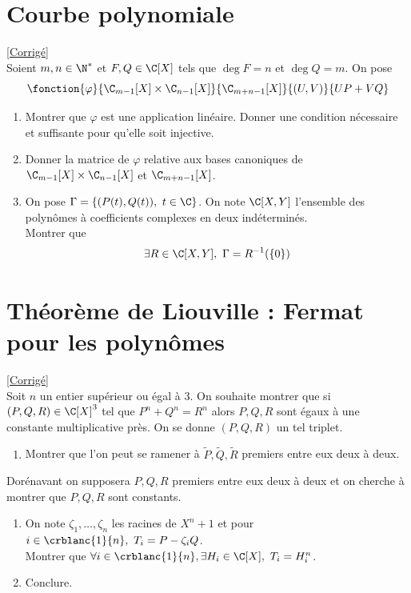 \documentclass{book}
\begin{document}
	\section{Courbe polynomiale}
	\textcolor{blue}{\hyperref[Courbe polynomiale corrigé]{[Corrigé]}}\\
	\label{Courbe polynomiale}
	Soient $m,n\in \N^*$ et $F,Q\in \C[X]$ tels que $\deg F=n$ et $\deg Q=m$. On pose $$\fonction{\varphi}{\C_{m-1}[X]\times \C_{n-1}[X]}{\C_{m+n-1}[X]}{(U,V)}{UP+VQ}$$
	\begin{enumerate}
		\item Montrer que $\varphi$ est une application linéaire. Donner une condition nécessaire et suffisante pour qu'elle soit injective.
		\item Donner la matrice de $\varphi$ relative aux bases canoniques de $\C_{m-1}[X]\times \C_{n-1}[X]$ et $\C_{m+n-1}[X]$.
		\item On pose $\Gamma=\{(P(t),Q(t)),\ t\in \C\}$. On note $\C[X,Y]$ l'ensemble des polynômes à coefficients complexes en deux indéterminés.\\
		Montrer que
		$$\exists R\in \C[X,Y],\ \Gamma=R^{-1}(\{0\})$$
	\end{enumerate}
	
	\section{Théorème de Liouville : Fermat pour les polynômes }
	\textcolor{blue}{\hyperref[Théorème de Liouville : Fermat pour les polynômes corrigé]{[Corrigé]}}\\
	\label{Théorème de Liouville : Fermat pour les polynômes}
	Soit $n$ un entier supérieur ou égal à $3$. On souhaite montrer que si $(P,Q,R)\in \C[X]^3$ tel que $P^n+Q^n=R^n$ alors $P,Q,R$ sont égaux à une constante multiplicative près. On se donne $(P,Q,R)$ un tel triplet.
	\begin{enumerate}
		\item Montrer que l'on peut se ramener à $\tilde P,\tilde Q,\tilde R$ premiers entre eux deux à deux.
	\end{enumerate} 
	Dorénavant on supposera $P,Q,R$ premiers entre eux deux à deux et on cherche à montrer que $P,Q,R$ sont constants.
	\begin{enumerate}[resume]
		\item On note $\zeta_1,\dots,\zeta_n$ les racines de $X^n+1$ et pour $i\in \crblanc{1}{n},\ T_i=P-\zeta_iQ$.\\
		Montrer que $\forall i\in \crblanc{1}{n},\exists H_i\in \C[X],\ T_i=H_i^n$.\\
		\item Conclure.
	\end{enumerate}
	
\end{document}
